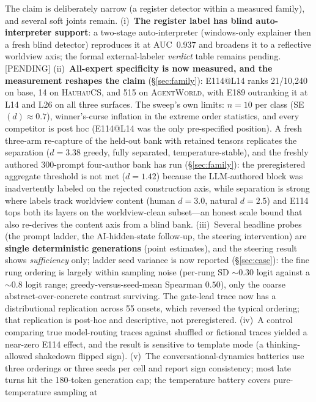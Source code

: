 \documentclass[10pt,a4paper,twocolumn]{article}
\begin{document}
The claim is deliberately narrow (a register detector within a measured
family), and several soft joints remain. (i)~\textbf{The register label has
blind auto-interpreter support}: a two-stage auto-interpreter (windows-only
explainer then a fresh blind detector) reproduces it at AUC~$0.937$ and
broadens it to a reflective worldview axis; the formal external-labeler
\emph{verdict} table remains pending. [PENDING]
(ii)~\textbf{All-expert specificity is now measured, and the measurement
reshapes the claim} (\S\ref{sec:family}): E114@L14 ranks 21/10{,}240 on base,
14 on \textsc{HauhauCS}, and 515 on \textsc{AgentWorld}, with E189 outranking
it at L14 and L26 on all three surfaces. The sweep's own limits: $n{=}10$ per
class (SE$(d){\approx}0.7$), winner's-curse inflation in the extreme order
statistics, and every competitor is post hoc (E114@L14 was the only
pre-specified position). A
fresh three-arm re-capture of the held-out bank with retained tensors
replicates the separation ($d{=}3.38$ greedy, fully separated,
temperature-stable), and the freshly authored 300-prompt four-author bank has
run (\S\ref{sec:family}): the preregistered aggregate threshold is not met
($d{=}1.42$) because the LLM-authored block was inadvertently labeled on the
rejected construction axis, while separation is strong where labels track
worldview content (human $d{=}3.0$, natural $d{=}2.5$) and E114 tops both its
layers on the worldview-clean subset---an honest scale bound that also
re-derives the content axis from a blind bank.
(iii)~Several headline probes (the prompt ladder, the AI-hidden-state
follow-up, the steering intervention) are \textbf{single deterministic
generations} (point estimates), and the steering result shows
\emph{sufficiency} only; ladder seed variance is now reported
(\S\ref{sec:case}): the fine rung ordering is largely within sampling noise
(per-rung SD $\sim$0.30 logit against a $\sim$0.8 logit range; greedy-versus-seed-mean
Spearman $0.50$), only the coarse abstract-over-concrete contrast surviving. The
gate-lead trace now has a distributional replication across 55 onsets, which
reversed the typical ordering; that replication is post-hoc and descriptive,
not preregistered.
(iv)~A control comparing true model-routing traces against shuffled or
fictional traces yielded a near-zero E114 effect, and the result is sensitive
to template mode (a thinking-allowed shakedown flipped sign).
(v)~The conversational-dynamics batteries use three orderings or three seeds
per cell and report sign consistency; most late turns hit the 180-token
generation cap; the temperature battery covers pure-temperature sampling at
\end{document}
